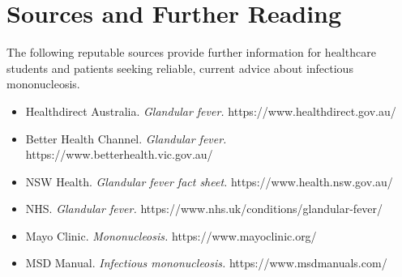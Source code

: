 \section*{Sources and Further Reading}
The following reputable sources provide further information for healthcare students and patients seeking reliable, current advice about infectious mononucleosis.
\begin{itemize}
    \item Healthdirect Australia. \textit{Glandular fever.} https://www.healthdirect.gov.au/
    \item Better Health Channel. \textit{Glandular fever.} https://www.betterhealth.vic.gov.au/
    \item NSW Health. \textit{Glandular fever fact sheet.} https://www.health.nsw.gov.au/
    \item NHS. \textit{Glandular fever.} https://www.nhs.uk/conditions/glandular-fever/
    \item Mayo Clinic. \textit{Mononucleosis.} https://www.mayoclinic.org/
    \item MSD Manual. \textit{Infectious mononucleosis.} https://www.msdmanuals.com/
\end{itemize}
